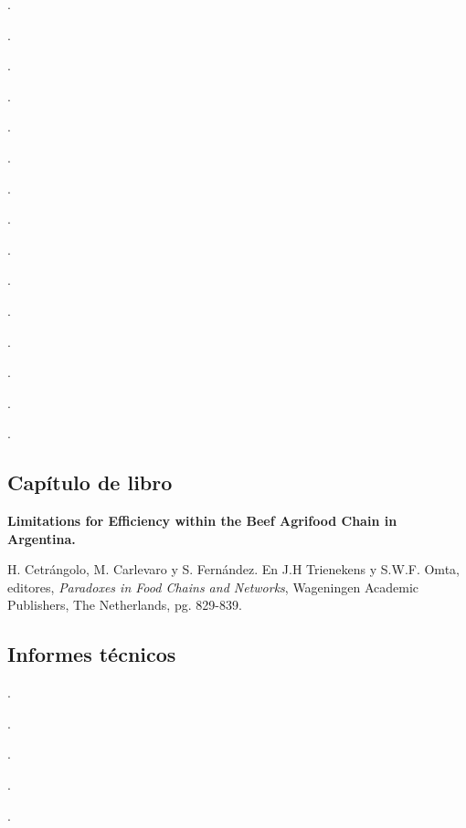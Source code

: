 \begin{etaremune}
\item {}.
\item {}.
\item {}.
\item {}.
\item {}.
\item {}.
\item {}.
\item {}.
\item {}.
\item {}.
\item {}.
\item {}.
\item {}.
\item {}.
\item {}.
\end{etaremune}


\subsection{Capítulo de libro}
\textbf{Limitations for Efficiency within the Beef Agrifood Chain in Argentina.}
 
 H. Cetrángolo, M. Carlevaro y S. Fernández. En J.H Trienekens y S.W.F. Omta, editores,  \textit{Paradoxes in Food Chains and Networks}, Wageningen Academic Publishers, The Netherlands, pg. 829-839.
 
 \subsection{Informes técnicos}
 \begin{etaremune}
 \item {} .
 \item {} .
  \item {} .
  \item {} .
  \item {} . 
 \end{etaremune}

 
